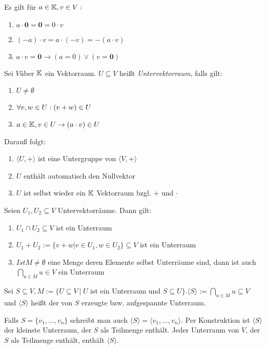 \begin{satz}
	Es gilt für $a \in \mathbb{K}, v \in V:$
	\begin{enumerate}[noitemsep]
		\item $a \cdot \boldsymbol{0} = \boldsymbol{0} = 0 \cdot v$
		\item $(-a) \cdot v = a \cdot (-v) = - (a \cdot v)$
		\item $a \cdot v = \boldsymbol{0} \rightarrow (a = 0) \lor (v = \boldsymbol{0})$
	\end{enumerate}
\end{satz}

\begin{definition}[Untervektorraum]
	Sei $V$über $\mathbb{K}$ ein Vektorraum. $U \subseteq V$ heißt \emph{Untervektorraum}, falls gilt:
	\begin{enumerate}[noitemsep]
		\item $U \neq \emptyset$
		\item $\forall v,w \in U : (v+w) \in U$
		\item $a \in \mathbb{K}, v \in U \rightarrow (a \cdot v) \in U$
	\end{enumerate}
	Darauß folgt:
	\begin{enumerate}[noitemsep]
		\item $\langle U, + \rangle$ ist eine Untergruppe von $\langle V, + \rangle$
		\item $U$ enthält automatisch den Nullvektor
		\item $U$ ist selbst wieder ein $\mathbb{K}$ Vektorraum bzgl. $+$ und $\cdot$
	\end{enumerate}
\end{definition}

\begin{satz} Seien $U_1, U_2 \subseteq V$ Untervektorräume. Dann gilt:
	\begin{enumerate}[noitemsep]
		\item $U_1 \cap U_2 \subseteq V$ ist ein Unterraum
		\item $U_1 + U_2 := \{v + w | v \in U_1, w \in U_2\} \subseteq V$ ist ein Unterraum
		\item $Ist M \neq \emptyset$ eine Menge deren Elemente selbst Unterräume sind, dann ist auch $\bigcap_{u \in M} u \in V$ ein Unterraum
	\end{enumerate}
\end{satz}

\pagebreak

\begin{definition}
	Sei $S \subseteq V, M := \{U \subseteq V \medspace \lvert \medspace U$  ist ein Unterraum und $S \subseteq U \}. \langle S \rangle := \bigcap_{u \in M} u \subseteq V $ und $\langle S \rangle$ heißt der von $S$ erzeugte bzw. aufgespannte Unterraum. 
	
	Falls $S = \{v_1,\dots, v_n\}$ schreibt man auch $\langle S \rangle = \langle v_1, \dots, v_n \rangle$. Per Konstruktion ist $\langle S \rangle$ der kleinste Unterraum, der $S$ als Teilmenge enthält. Jeder Unterraum von $V$, der $S$ als Teilmenge enthält, enthält $\langle S \rangle$.
\end{definition}

